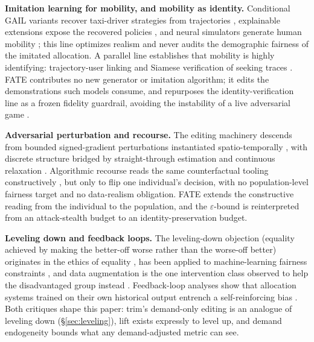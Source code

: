 \textbf{Imitation learning for mobility, and mobility as identity.}
Conditional GAIL variants recover taxi-driver strategies from trajectories
\cite{zhang2019cgail,zhang2022cgail}, explainable extensions expose the
recovered policies \cite{pan2020xgail}, and neural simulators generate human
mobility \cite{feng2020simulate}; this line optimizes realism and never
audits the demographic fairness of the imitated allocation. A parallel line
establishes that mobility is highly identifying: trajectory-user linking
\cite{gao2017tuler,zhou2018tulvae,miao2020deeptul} and Siamese verification
of seeking traces \cite{ren2020stsiamese}. FATE contributes no new generator
or imitation algorithm; it edits the demonstrations such models consume, and
repurposes the identity-verification line as a frozen fidelity guardrail,
avoiding the instability of a live adversarial game \cite{hoermon2016}.

\textbf{Adversarial perturbation and recourse.} The editing machinery
descends from bounded signed-gradient perturbations
\cite{goodfellow2015fgsm,kurakin2017ifgsm} instantiated spatio-temporally
\cite{hu2023stifgsm}, with discrete structure bridged by straight-through
estimation \cite{bengio2013ste} and continuous relaxation
\cite{jang2017gumbel,maddison2017concrete}. Algorithmic recourse reads the
same counterfactual tooling constructively \cite{ustun2019recourse,
wachter2018counterfactual}, but only to flip one individual's decision, with
no population-level fairness target and no data-realism obligation. FATE
extends the constructive reading from the individual to the population, and
the $\varepsilon$-bound is reinterpreted from an attack-stealth budget to an
identity-preservation budget.

\textbf{Leveling down and feedback loops.} The leveling-down objection
(equality achieved by making the better-off worse rather than the worse-off
better) originates in the ethics of equality \cite{parfit1997}, has been
applied to machine-learning fairness constraints \cite{mittelstadt2024}, and
data augmentation is the one intervention class observed to help the
disadvantaged group instead \cite{zietlow2022}. Feedback-loop analyses show
that allocation systems trained on their own historical output entrench a
self-reinforcing bias \cite{ensign2018,lumisaac2016}. Both critiques shape
this paper: trim's demand-only editing is an analogue of leveling down
(\S\ref{sec:leveling}), lift exists expressly to level up, and demand
endogeneity bounds what any demand-adjusted metric can see.
